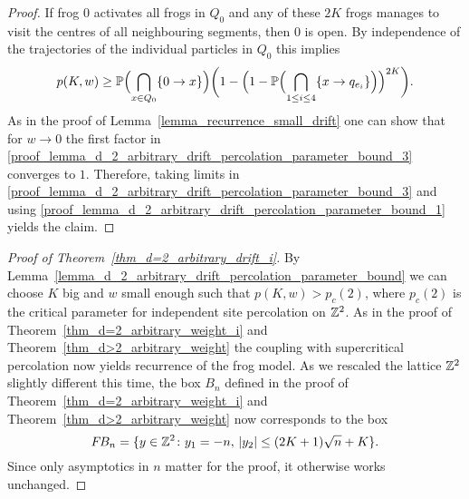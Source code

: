 \begin{proof}
If frog $0$ activates all frogs in $Q_0$ and any of these $2K$ frogs manages to visit the centres of all neighbouring segments, then $0$ is open. By independence of the trajectories of the individual particles in $Q_0$ this implies
\begin{equation}\label{proof_lemma_d_2_arbitrary_drift_percolation_parameter_bound_3}
 p(K,w) \geq \P\Bigl( \bigcap_{x \in Q_0} \{0 \to x\} \Bigr) \biggl(1- \Bigl(1-\P\Bigl(\bigcap_{1\leq i \leq 4} \{x \to q_{e_i}\}\Bigr)\Bigr)^{2K} \biggr).
\end{equation}
As in the proof of Lemma~\ref{lemma_recurrence_small_drift} one can show that for $w \to 0$ the first factor in \eqref{proof_lemma_d_2_arbitrary_drift_percolation_parameter_bound_3} converges to $1$. Therefore, taking limits in \eqref{proof_lemma_d_2_arbitrary_drift_percolation_parameter_bound_3} and using \eqref{proof_lemma_d_2_arbitrary_drift_percolation_parameter_bound_1} yields the claim.
\end{proof}

\begin{proof}[Proof of Theorem~\ref{thm_d=2_arbitrary_drift_i}]
By Lemma~\ref{lemma_d_2_arbitrary_drift_percolation_parameter_bound} we can choose $K$ big and $w$ small enough such that $p(K,w) > p_c(2)$, where $p_c(2)$ is the critical parameter for independent site percolation on $\Z^2$. As in the proof of Theorem~\ref{thm_d=2_arbitrary_weight_i} and Theorem~\ref{thm_d>2_arbitrary_weight} the coupling with supercritical percolation now yields recurrence of the frog model. As we rescaled the lattice $\Z^2$ slightly different this time, the box $B_n$ defined in the proof of Theorem~\ref{thm_d=2_arbitrary_weight_i} and Theorem~\ref{thm_d>2_arbitrary_weight} now corresponds to the box
\begin{equation*}
\fb_n = \{y \in \Z^2 \colon y_1 =-n,\, \lvert y_2\rvert \leq (2K+1)\sqrt{n} +K\}.
\end{equation*}
Since only asymptotics in $n$ matter for the proof, it otherwise works unchanged.
\end{proof}


